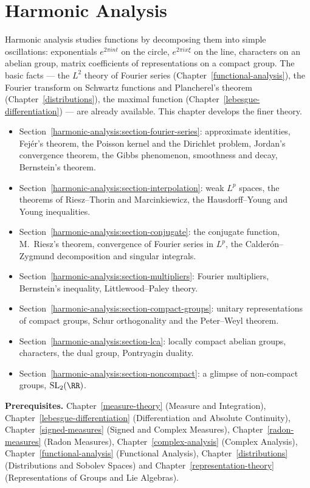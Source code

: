 \chapter{Harmonic Analysis}\label{harmonic-analysis}

Harmonic analysis studies functions by decomposing them into simple oscillations: exponentials $e^{2\pi int}$ on the circle, $e^{2\pi ix\xi}$ on the line, characters on an abelian group, matrix
coefficients of representations on a compact group. The basic facts --- the $L^2$ theory of Fourier series (Chapter~\ref{functional-analysis}), the Fourier transform on Schwartz functions and Plancherel's theorem
(Chapter~\ref{distributions}), the maximal function (Chapter~\ref{lebesgue-differentiation}) --- are already available. This chapter develops the finer theory.
\begin{itemize}
\item Section~\ref{harmonic-analysis:section-fourier-series}: approximate identities, Fej\'er's theorem, the Poisson kernel and the Dirichlet problem, Jordan's convergence theorem, the Gibbs phenomenon, smoothness and decay,
Bernstein's theorem.
\item Section~\ref{harmonic-analysis:section-interpolation}: weak $L^p$ spaces, the theorems of Riesz--Thorin and Marcinkiewicz, the Hausdorff--Young and Young inequalities.
\item Section~\ref{harmonic-analysis:section-conjugate}: the conjugate function, M.\ Riesz's theorem, convergence of Fourier series in $L^p$, the Calder\'on--Zygmund decomposition and singular integrals.
\item Section~\ref{harmonic-analysis:section-multipliers}: Fourier multipliers, Bernstein's inequality, Littlewood--Paley theory.
\item Section~\ref{harmonic-analysis:section-compact-groups}: unitary representations of compact groups, Schur orthogonality and the Peter--Weyl theorem.
\item Section~\ref{harmonic-analysis:section-lca}: locally compact abelian groups, characters, the dual group, Pontryagin duality.
\item Section~\ref{harmonic-analysis:section-noncompact}: a glimpse of non-compact groups, $\mathrm{SL}_2(\RR)$.
\end{itemize}

\noindent\textbf{Prerequisites.} Chapter~\ref{measure-theory} (Measure and Integration), Chapter~\ref{lebesgue-differentiation} (Differentiation and Absolute Continuity), Chapter~\ref{signed-measures} (Signed and
Complex Measures), Chapter~\ref{radon-measures} (Radon Measures), Chapter~\ref{complex-analysis} (Complex Analysis), Chapter~\ref{functional-analysis} (Functional Analysis), Chapter~\ref{distributions}
(Distributions and Sobolev Spaces) and Chapter~\ref{representation-theory} (Representations of Groups and Lie Algebras).

